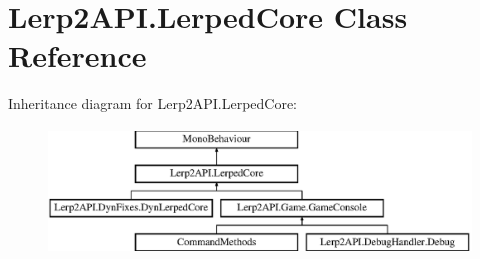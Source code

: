 \hypertarget{class_lerp2_a_p_i_1_1_lerped_core}{}\section{Lerp2\+A\+P\+I.\+Lerped\+Core Class Reference}
\label{class_lerp2_a_p_i_1_1_lerped_core}
Inheritance diagram for Lerp2\+A\+P\+I.\+Lerped\+Core\+:\begin{figure}[H]
\begin{center}
\leavevmode
\includegraphics[height=3.318518cm]{class_lerp2_a_p_i_1_1_lerped_core}
\end{center}
\end{figure}

